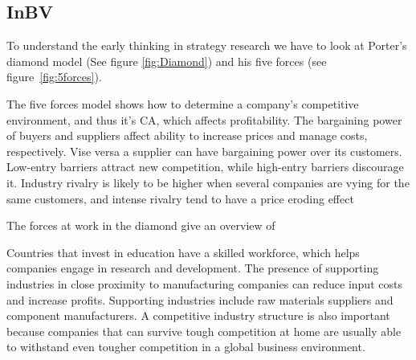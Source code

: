 \subsection{\glsdesc{InBV}} %

To understand the early thinking in strategy research we have to look at Porter's diamond model (See figure \ref{fig:Diamond}) and his five forces (see figure~\ref{fig:5forces}).  


The five forces model shows how to determine a company's competitive environment, and thus it's \gls{CA}, which affects profitability. 
The bargaining power of buyers and suppliers affect ability to increase prices and manage costs, respectively. 
Vise versa a supplier can have bargaining power over its customers. Low-entry barriers attract new competition, while high-entry barriers discourage it. 
Industry rivalry is likely to be higher when several companies are vying for the same customers, and intense rivalry tend to have a price eroding effect

The forces at work in the diamond give an overview of 

Countries that invest in education have a skilled workforce, which helps companies engage in research and development. 
The presence of supporting industries in close proximity to manufacturing companies can reduce input costs and increase profits. 
Supporting industries include raw materials suppliers and component manufacturers. 
A competitive industry structure is also important because companies that can survive tough competition at home are usually able to withstand even tougher competition in a global business environment.





